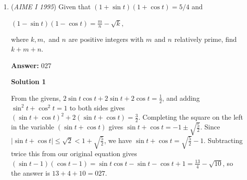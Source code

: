 \begin{enumerate}
 



\textbf{Solution 2}

Let $n=p_1^{k_1}p_2^{k_2}$ for some primes $p_1,p_2$. Then $n^2$ has $\frac{(2k_1+1)(2k_2+1)-1}{2}$ factors less than $n$. 

 This simplifies to $\frac{4k_1k_2+2k_1+2k_2}{2}=2k_1k_2+k_1+k_2$.

 The number of factors of $n$ less than $n$ is equal to $(k_1+1)(k_2+1)-1=k_1k_2+k_1+k_2$.

 Thus, our general formula for $n=p_1^{k_1}p_2^{k_2}$ is

 Number of factors that satisfy the above $=(2k_1k_2+k_1+k_2)-(k_1k_2+k_1+k_2)=k_1k_2$

 Incorporating this into our problem gives $19\times31=\boxed{589}$.

 



\textbf{Solution 3}

Consider divisors of $n^2: a,b$ such that $ab=n^2$.WLOG, let $b\ge{a}$ and $b=\frac{n}{a}$

 Then, it is easy to see that $a$ will always be less than $b$ as we go down the divisor list of $n^2$ until we hit $n$. 

 Therefore, the median divisor of $n^2$ is $n$.

 Then, there are $(63)(39)=2457$ divisors of $n^2$. Exactly $\frac{2457-1}{2}=1228$ of these divisors are $<n$

 There are $(32)(20)-1=639$ divisors of $n$ that are $<n$.

 Therefore, the answer is $1228-639=\boxed{589}$.

 Note: the problem where this is linked is covered 0:13-1:15

 


	\item (\textit{AIME I 1995}) Given that $(1+\sin t)(1+\cos t)=5/4$ and


 $(1-\sin t)(1-\cos t)=\frac mn-\sqrt{k},$

 where $k, m,$ and $n_{}$ are positive integers with $m_{}$ and $n_{}$ relatively prime, find $k+m+n.$

 \textbf{Answer: }027



\textbf{Solution 1}

From the givens, $2\sin t \cos t + 2 \sin t + 2 \cos t = \frac{1}{2}$, and adding $\sin^2 t + \cos^2t = 1$ to both sides gives $(\sin t + \cos t)^2 + 2(\sin t + \cos t) = \frac{3}{2}$.  Completing the square on the left in the variable $(\sin t + \cos t)$ gives $\sin t + \cos t = -1 \pm \sqrt{\frac{5}{2}}$.  Since $|\sin t + \cos t| \leq \sqrt 2 < 1 + \sqrt{\frac{5}{2}}$, we have $\sin t + \cos t = \sqrt{\frac{5}{2}} - 1$.  Subtracting twice this from our original equation gives $(\sin t - 1)(\cos t - 1) = \sin t \cos t - \sin t - \cos t + 1 = \frac{13}{4} - \sqrt{10}$, so the answer is $13 + 4 + 10 = \boxed{027}$.


\end{enumerate}
